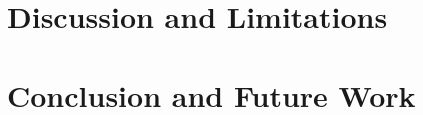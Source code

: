 \documentclass{vgtc}                          %
\begin{document}

\section{Discussion and Limitations}
%



\section{Conclusion and Future Work}



%

%
%
%


\end{document}
